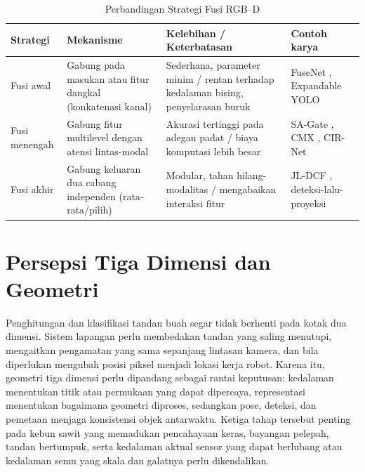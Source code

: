 \begin{table}[t]
\centering
\caption{Perbandingan Strategi Fusi RGB--D}
\label{tab:fusi}
\begin{tabular}{@{}p{2.1cm}p{4.2cm}p{4.2cm}p{4.6cm}@{}}
\toprule
\textbf{Strategi} & \textbf{Mekanisme} & \textbf{Kelebihan / Keterbatasan} & \textbf{Contoh karya} \\
\midrule
Fusi awal & Gabung pada masukan atau fitur dangkal (konkatenasi kanal) &
Sederhana, parameter minim / rentan terhadap kedalaman bising, penyelarasan buruk &
FuseNet \cite{hazirbas2016fusenet}, Expandable YOLO \cite{takahashi2020expandableyolo} \\
Fusi menengah & Gabung fitur multilevel dengan atensi lintas-modal &
Akurasi tertinggi pada adegan padat / biaya komputasi lebih besar &
SA-Gate \cite{chen2020sagate}, CMX \cite{zhang2023cmx}, CIR-Net \cite{cong2022cirnet} \\
Fusi akhir & Gabung keluaran dua cabang independen (rata-rata/pilih) &
Modular, tahan hilang-modalitas / mengabaikan interaksi fitur &
JL-DCF \cite{fu2020jldcf}, deteksi-lalu-proyeksi \cite{elamraoui2024fusionvision} \\
\bottomrule
\end{tabular}
\end{table}


\section{Persepsi Tiga Dimensi dan Geometri}\label{sec:3d}
Penghitungan dan klasifikasi tandan buah segar tidak berhenti pada kotak dua dimensi. Sistem lapangan perlu membedakan tandan yang saling menutupi, mengaitkan pengamatan yang sama sepanjang lintasan kamera, dan bila diperlukan mengubah posisi piksel menjadi lokasi kerja robot. Karena itu, geometri tiga dimensi perlu dipandang sebagai rantai keputusan: kedalaman menentukan titik atau permukaan yang dapat dipercaya, representasi menentukan bagaimana geometri diproses, sedangkan pose, deteksi, dan pemetaan menjaga konsistensi objek antarwaktu. Ketiga tahap tersebut penting pada kebun sawit yang memadukan pencahayaan keras, bayangan pelepah, tandan bertumpuk, serta kedalaman aktual sensor yang dapat berlubang atau kedalaman semu yang skala dan galatnya perlu dikendalikan.

